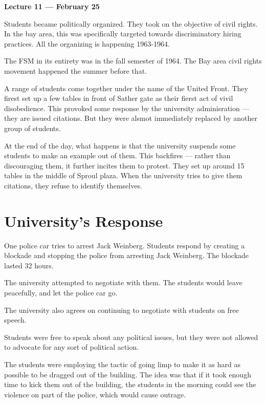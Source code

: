 
\vspace{3mm}
\noindent \textbf{Lecture 11 --- February 25\th}

Students became politically organized.
They took on the objective of civil rights.
In the bay area, this was specifically targeted towards discriminatory hiring practices.
All the organizing is happening 1963-1964.

The FSM in its entirety was in the fall semester of 1964.
The Bay area civil rights movement happened the summer before that.

A range of students come together under the name of the United Front.
They firest set up a few tables in front of Sather gate as their fierst act of vivil disobedience.
This provoked some response by the university adminisration --- they are issued citations.
But they were alsmot immediately replaced by another group of students.

At the end of the day, what happens is that the university suspends some students to make an example out of them.
This backfires --- rather than discouraging them, it further incites them to protest.
They set up around 15 tables in the middle of Sproul plaza.
When the university tries to give them citations, they refuse to identify themselves.


\section{University's Response}
One police car tries to arrest Jack Weinberg.
Students respond by creating a blockade and stopping the police from arresting Jack Weinberg.
The blockade lasted 32 hours.

The university attempted to negotiate with them.
The students would leave peacefully, and let the police car go.

The university also agrees on continuing to negotiate with students on free speech.

Students were free to speak about any political issues, but they were not allowed to advocate for any sort of political action.

The students were employing the tactic of going limp to make it as hard as possible to be dragged out of the building.
The idea was that if it took enough time to kick them out of the building, the students in the morning could see the violence on part of the police, which would cause outrage.
